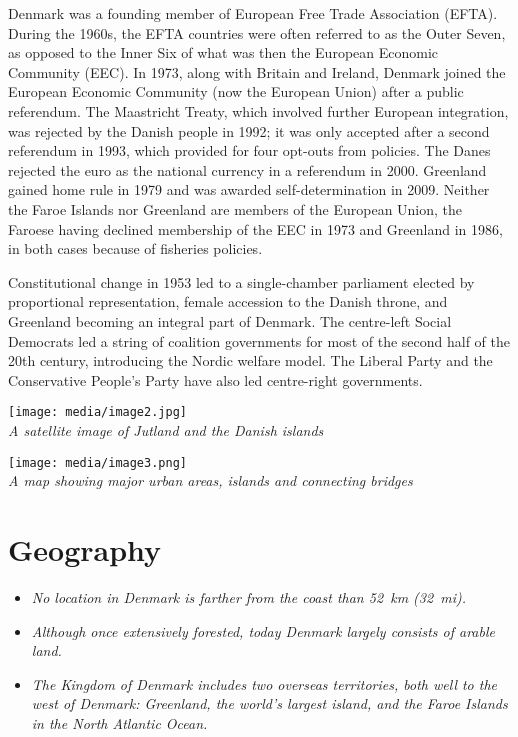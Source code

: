 Denmark was a founding member of European Free Trade Association (EFTA).
During the 1960s, the EFTA countries were often referred to as the Outer
Seven, as opposed to the Inner Six of what was then the European
Economic Community (EEC). In 1973, along with Britain and Ireland,
Denmark joined the European Economic Community (now the European Union)
after a public referendum. The Maastricht Treaty, which involved further
European integration, was rejected by the Danish people in 1992; it was
only accepted after a second referendum in 1993, which provided for four
opt-outs from policies. The Danes rejected the euro as the national
currency in a referendum in 2000. Greenland gained home rule in 1979 and
was awarded self-determination in 2009. Neither the Faroe Islands nor
Greenland are members of the European Union, the Faroese having declined
membership of the EEC in 1973 and Greenland in 1986, in both cases
because of fisheries policies.

Constitutional change in 1953 led to a single-chamber parliament elected
by proportional representation, female accession to the Danish throne,
and Greenland becoming an integral part of Denmark. The centre-left
Social Democrats led a string of coalition governments for most of the
second half of the 20th century, introducing the Nordic welfare model.
The Liberal Party and the Conservative People's Party have also led
centre-right governments.

\texttt{[image: media/image2.jpg]}\\
\emph{A satellite image of Jutland and the Danish islands}

\texttt{[image: media/image3.png]}\\
\emph{A map showing major urban areas, islands and connecting bridges}

\section{Geography}\label{geography}

\begin{itemize}
\item
  \emph{No location in Denmark is farther from the coast than 52~km
  (32~mi).}
\item
  \emph{Although once extensively forested, today Denmark largely
  consists of arable land.}
\item
  \emph{The Kingdom of Denmark includes two overseas territories, both
  well to the west of Denmark: Greenland, the world's largest island,
  and the Faroe Islands in the North Atlantic Ocean.}
\end{itemize}

